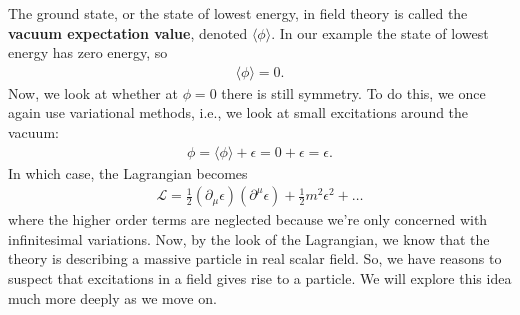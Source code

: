 \documentclass[a4paper,11pt]{article}
\numberwithin{equation}{section}
\theoremstyle{definition}
\newcommand{\p}{\partial}
\newcommand{\lag}{\mathcal{L}}
\begin{document}
The ground state, or the state of lowest energy, in field theory is called the \textbf{vacuum expectation value}, denoted $\langle \phi \rangle$. In our example the state of lowest energy has zero energy, so
\begin{align*}
\langle \phi \rangle  = 0.
\end{align*}
Now, we look at whether at $\phi = 0$ there is still symmetry. To do this, we once again use variational methods, i.e., we look at small excitations around the vacuum:
\begin{align}
\phi = \langle \phi \rangle + \epsilon = 0+\epsilon = \epsilon.
\end{align}
In which case, the Lagrangian becomes
\begin{align}
\lag = \frac{1}{2}(\p_\mu\epsilon)(\p^\mu\epsilon) + \frac{1}{2}m^2\epsilon^2+\dots
\end{align}
where the higher order terms are neglected because we're only concerned with infinitesimal variations. Now, by the look of the Lagrangian, we know that the theory is describing a massive particle in real scalar field. So, we have reasons to suspect that excitations in a field gives rise to a particle. We will explore this idea much more deeply as we move on.\\
\end{document}
